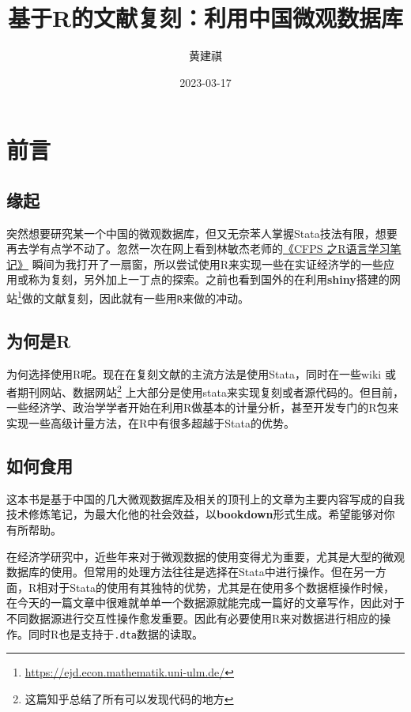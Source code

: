 \documentclass[
  oneside]{book}
\title{基于R的文献复刻：利用中国微观数据库}
\author{黄建祺}
\date{2023-03-17}
\begin{document}
\maketitle

{
\setcounter{tocdepth}{1}
\tableofcontents
}
\hypertarget{ux524dux8a00}{%
\chapter*{前言}\label{ux524dux8a00}}

\hypertarget{ux7f18ux8d77}{%
\section{缘起}\label{ux7f18ux8d77}}

突然想要研究某一个中国的微观数据库，但又无奈苯人掌握Stata技法有限，想要再去学有点学不动了。忽然一次在网上看到林敏杰老师的\href{https://bookdown.org/wangminjie/R4cfps/}{《CFPS 之R语言学习笔记》} 瞬间为我打开了一扇窗，所以尝试使用R来实现一些在实证经济学的一些应用或称为复刻，另外加上一丁点的探索。之前也看到国外的在利用\textbf{shiny}搭建的网站\footnote{\url{https://ejd.econ.mathematik.uni-ulm.de/}}做的文献复刻，因此就有一些用\texttt{R}来做的冲动。

\hypertarget{ux4e3aux4f55ux662fr}{%
\section{为何是R}\label{ux4e3aux4f55ux662fr}}

为何选择使用R呢。现在在复刻文献的主流方法是使用Stata，同时在一些wiki 或者期刊网站、数据网站\footnote{这篇知乎总结了所有可以发现代码的地方} 上大部分是使用stata来实现复刻或者源代码的。但目前，一些经济学、政治学学者开始在利用R做基本的计量分析，甚至开发专门的R包来实现一些高级计量方法，在R中有很多超越于Stata的优势。

\hypertarget{ux5982ux4f55ux98dfux7528}{%
\section{如何食用}\label{ux5982ux4f55ux98dfux7528}}

这本书是基于中国的几大微观数据库及相关的顶刊上的文章为主要内容写成的自我技术修炼笔记，为最大化他的社会效益，以\textbf{bookdown}形式生成。希望能够对你有所帮助。

在经济学研究中，近些年来对于微观数据的使用变得尤为重要，尤其是大型的微观数据库的使用。但常用的处理方法往往是选择在Stata中进行操作。但在另一方面，R相对于Stata的使用有其独特的优势，尤其是在使用多个数据框操作时候，在今天的一篇文章中很难就单单一个数据源就能完成一篇好的文章写作，因此对于不同数据源进行交互性操作愈发重要。因此有必要使用R来对数据进行相应的操作。同时R也是支持于\texttt{.dta}数据的读取。
\end{document}
